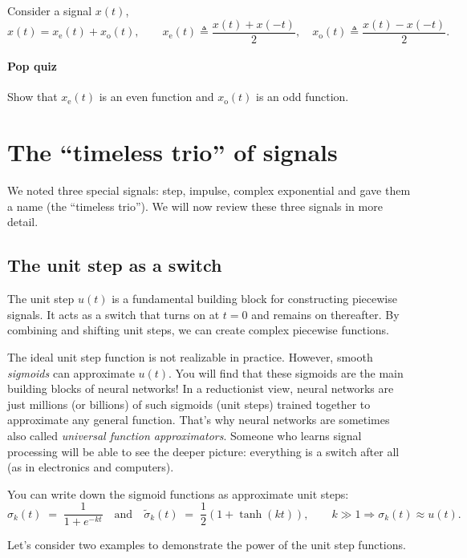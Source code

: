 \documentclass{ee102_notes}
\begin{document}
Consider a signal $x(t)$,
\[
x(t) = x_{\text{e}}(t) + x_{\text{o}}(t),\qquad
x_{\text{e}}(t) \triangleq \frac{x(t)+x(-t)}{2},\quad
x_{\text{o}}(t) \triangleq \frac{x(t)-x(-t)}{2}.
\]

\paragraph{Pop quiz}
Show that $x_{\text{e}}(t)$ is an even function and $x_{\text{o}}(t)$ is an odd function.


\section{The ``timeless trio'' of signals}
We noted three special signals: step, impulse, complex exponential and gave them a name (the ``timeless trio''). We will now review these three signals in more detail.
\
\subsection{The unit step as a switch}
The unit step $u(t)$ is a fundamental building block for constructing piecewise signals. It acts as a switch that turns on at \(t=0\) and remains on thereafter. By combining and shifting unit steps, we can create complex piecewise functions.

The ideal unit step function is not realizable in practice. However, smooth \emph{sigmoids} can approximate $u(t)$. You will find that these sigmoids are the main building blocks of neural networks! In a reductionist view, neural networks are just millions (or billions) of such sigmoids (unit steps) trained together to approximate any general function. That's why neural networks are sometimes also called \emph{universal function approximators}. Someone who learns signal processing will be able to see the deeper picture: everything is a switch after all (as in electronics and computers).

You can write down the sigmoid functions as approximate unit steps:
\[
\sigma_k(t) \;=\; \frac{1}{1+e^{-k t}}
\quad\text{and}\quad
\tilde\sigma_k(t) \;=\; \frac{1}{2}\!\left(1+\tanh(kt)\right),
\qquad k\gg 1 \Rightarrow \sigma_k(t)\approx u(t).
\]

Let's consider two examples to demonstrate the power of the unit step functions. 
\end{document}
